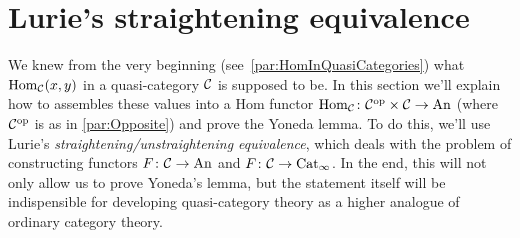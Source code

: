 \newpage
\section{Lurie's straightening equivalence}\label{sec:Straightening}
We knew from the very beginning (see~\cref{par:HomInQuasiCategories}) what $\operatorname{Hom}_{\mathcal{C}}(x,y)$ in a quasi-category $\mathcal{C}$ is supposed to be. In this section we'll explain how to assembles these values into a Hom functor $\operatorname{Hom}_{\mathcal{C}}\colon \mathcal{C}^{\mathrm{op}}\times\mathcal{C}\rightarrow\mathrm{An}$ (where $\mathcal{C}^{\mathrm{op}}$ is as in \cref{par:Opposite}) and prove the Yoneda lemma. To do this, we'll use Lurie's \emph{straightening/unstraightening equivalence}, which deals with the problem of constructing functors $F\colon \mathcal{C}\rightarrow\mathrm{An}$ and $F\colon \mathcal{C}\rightarrow\mathrm{Cat}_\infty$. In the end, this will not only allow us to prove Yoneda's lemma, but the statement itself will be indispensible for developing quasi-category theory as a higher analogue of ordinary category theory.

